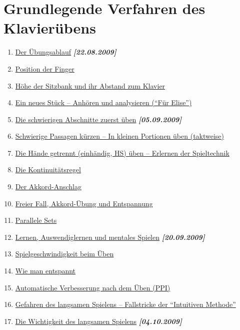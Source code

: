 \section{Grundlegende Verfahren des Klavierübens}

\begin{enumerate} 
 \item \hyperref[c1ii1]{Der Übungsablauf} \textbf{\textit{[22.08.2009]}}
 \item \hyperref[c1ii2]{Position der Finger}
 \item \hyperref[c1ii3]{Höhe der Sitzbank und ihr Abstand zum Klavier}
 \item \hyperref[c1ii4]{Ein neues Stück -- Anhören und analysieren (\enquote{Für Elise})}
 \item \hyperref[c1ii5]{Die schwierigen Abschnitte zuerst üben}  \textbf{\textit{[05.09.2009]}}
 \item \hyperref[c1ii6]{Schwierige Passagen kürzen -- In kleinen Portionen üben (taktweise)}
 \item \hyperref[c1ii7]{Die Hände getrennt (einhändig, HS) üben -- Erlernen der Spieltechnik}
 \item \hyperref[c1ii8]{Die Kontinuitätsregel}
 \item \hyperref[c1ii9]{Der Akkord-Anschlag}
 \item \hyperref[c1ii10]{Freier Fall, Akkord-Übung und Entspannung}
 \item \hyperref[c1ii11]{Parallele Sets}
 \item \hyperref[c1ii12]{Lernen, Auswendiglernen und mentales Spielen} \textbf{\textit{[20.09.2009]}}
 \item \hyperref[c1ii13]{Spielgeschwindigkeit beim Üben}
 \item \hyperref[c1ii14]{Wie man entspannt}
 \item \hyperref[c1ii15]{Automatische Verbesserung nach dem Üben (PPI)}
 \item \hyperref[c1ii16]{Gefahren des langsamen Spielens -- Fallstricke der \enquote{Intuitiven Methode}}
 \item \hyperref[c1ii17]{Die Wichtigkeit des langsamen Spielens} \textbf{\textit{[04.10.2009]}}


\end{enumerate}
